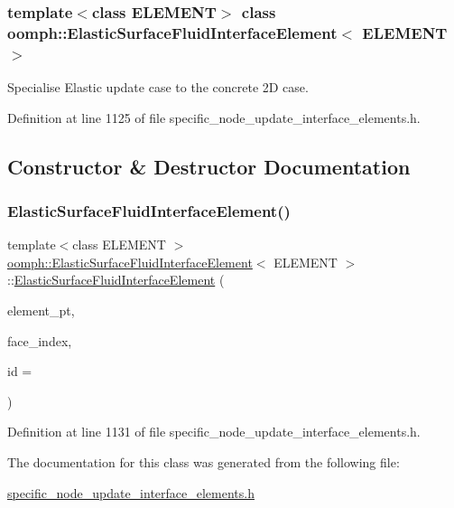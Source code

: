 \subsubsection*{template$<$class E\+L\+E\+M\+E\+NT$>$\newline
class oomph\+::\+Elastic\+Surface\+Fluid\+Interface\+Element$<$ E\+L\+E\+M\+E\+N\+T $>$}

Specialise Elastic update case to the concrete 2D case. 

Definition at line 1125 of file specific\+\_\+node\+\_\+update\+\_\+interface\+\_\+elements.\+h.



\subsection{Constructor \& Destructor Documentation}
\mbox{\label{classoomph_1_1ElasticSurfaceFluidInterfaceElement_aa2add34e23b16990c7000d699bc395e2}} 
\subsubsection{\texorpdfstring{Elastic\+Surface\+Fluid\+Interface\+Element()}{ElasticSurfaceFluidInterfaceElement()}}
{\footnotesize\ttfamily template$<$class E\+L\+E\+M\+E\+NT $>$ \\
\hyperlink{classoomph_1_1ElasticSurfaceFluidInterfaceElement}{oomph\+::\+Elastic\+Surface\+Fluid\+Interface\+Element}$<$ E\+L\+E\+M\+E\+NT $>$\+::\hyperlink{classoomph_1_1ElasticSurfaceFluidInterfaceElement}{Elastic\+Surface\+Fluid\+Interface\+Element} (\begin{DoxyParamCaption}\item[{\hyperlink{classoomph_1_1FiniteElement}{Finite\+Element} $\ast$const \&}]{element\+\_\+pt,  }\item[{const int \&}]{face\+\_\+index,  }\item[{const unsigned \&}]{id = {} }\end{DoxyParamCaption})\hspace{0.3cm}{\ttfamily [inline]}}



Definition at line 1131 of file specific\+\_\+node\+\_\+update\+\_\+interface\+\_\+elements.\+h.



The documentation for this class was generated from the following file\+:\begin{DoxyCompactItemize}
\item 
\hyperlink{specific__node__update__interface__elements_8h}{specific\+\_\+node\+\_\+update\+\_\+interface\+\_\+elements.\+h}\end{DoxyCompactItemize}
